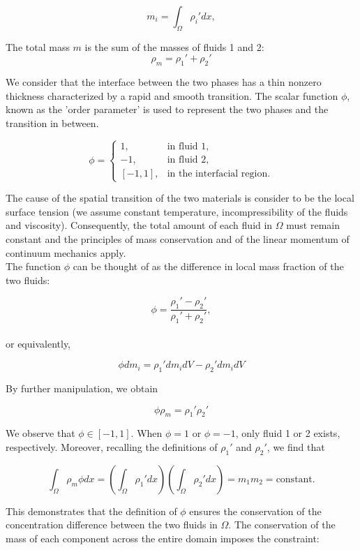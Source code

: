 \documentclass{article}
\begin{document}
\[
m_i = \int_{\Omega} \rho_i' dx,
\]


The total mass $m$ is the sum of the masses of fluids 1 and 2:\\

\[
\rho_m = \rho_1' + \rho_2'
\]

We consider that the interface between the two phases has a thin nonzero thickness characterized by a rapid and smooth transition. The scalar function $\phi$, known as the 'order parameter' is used to represent the two phases and the transition in between.

\[
\phi = \begin{cases}
    1, & \text{in fluid 1}, \\
    -1, & \text{in fluid 2}, \\
    [-1, 1], & \text{in the interfacial region}.
\end{cases}
\]

The cause of the spatial transition of the two materials is consider to be the local surface tension (we assume constant temperature, incompressibility of the fluids and viscosity). Consequently, the total amount of each fluid in $\Omega$ must remain constant and the principles of mass conservation and of the linear momentum of continuum mechanics apply.\\
The function $\phi$ can be thought of as the difference in local mass fraction of the two fluids:

\[
\phi = \frac{\rho_1' - \rho_2'}{\rho_1' + \rho_2'},
\]\\


or equivalently,

\[
\phi dm_i = \rho_1' dm_idV - \rho_2' dm_i dV
\]

By further manipulation, we obtain

\[
\phi \rho_m = \rho_1' \rho_2'
\]

We observe that $\phi \in [-1, 1]$. When $\phi = 1$ or $\phi = -1$, only fluid 1 or 2 exists, respectively. Moreover, recalling the definitions of $\rho_1'$ and $\rho_2'$, we find that

\[
\int_{\Omega} \rho_m \phi dx = \left(\int_{\Omega} \rho_1' dx\right) \left(\int_{\Omega} \rho_2' dx\right) = m_1 m_2 = \text{constant}.
\]

This demonstrates that the definition of $\phi$ ensures the conservation of the concentration difference between the two fluids in $\Omega$. The conservation of the mass of each component across the entire domain imposes the constraint:
\end{document}
